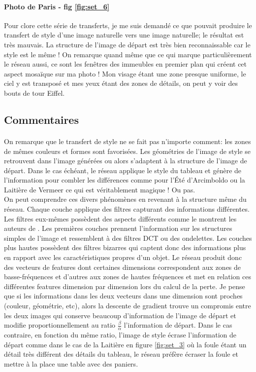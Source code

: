 \documentclass{article}
\begin{document}
\paragraph*{Photo de Paris - fig \ref{fig:set_6}} Pour clore cette série de transferts, je me suis demandé ce que pouvait produire le transfert de style d'une image naturelle vers une image naturelle; le résultat est très mauvais. La structure de l'image de départ est très bien reconnaissable car le style est le même ! On remarque quand même que ce qui marque particulièrement le réseau aussi, ce sont les fenêtres des immeubles en premier plan qui créent cet aspect mosaïque sur ma photo ! Mon visage étant une zone presque uniforme, le ciel y est transposé et mes yeux étant des zones de détails, on peut y voir des bouts de tour Eiffel.

\subsection*{Commentaires}
\paragraph*{} On remarque que le transfert de style ne se fait pas n'importe comment: les zones de mêmes couleurs et formes sont favorisées. Les géométries de l'image de style se retrouvent dans l'image générées ou alors s'adaptent à la structure de l'image de départ. Dans le cas échéant, le réseau applique le style du tableau et génère de l'information pour combler les différences comme pour l’Été d'Arcimboldo ou la Laitière de Vermeer ce qui est véritablement magique ! Ou pas.\\
On peut comprendre ces divers phénomènes en revenant à la structure même du réseau. Chaque couche applique des filtres capturant des informations différentes. Les filtres eux-mêmes possèdent des aspects différents comme le montrent les auteurs de \cite{DBLP:journals/corr/ZeilerF13}. Les premières couches prennent l'information sur les structures simples de l'image et ressemblent à des filtres DCT ou des ondelettes. Les couches plus hautes possèdent des filtres bizarres qui captent donc des informations plus en rapport avec les caractéristiques propres d'un objet. Le réseau produit donc des vecteurs de features dont certaines dimensions correspondent aux zones de basse-fréquences et d'autres aux zones de hautes fréquences et met en relation ces différentes features dimension par dimension lors du calcul de la perte. Je pense que si les informations dans les deux vecteurs dans une dimension sont proches (couleur, géométrie, etc), alors la descente de gradient trouve un compromis entre les deux images qui conserve beaucoup d'information de l'image de départ et modifie proportionnellement au ratio $\frac{\beta}{\alpha}$ l'information de départ. Dans le cas contraire, en fonction du même ratio, l'image de style écrase l'information de départ comme dans le cas de la Laitière en figure \ref{fig:set_3} où la foule étant un détail très différent des détails du tableau, le réseau préfère écraser la foule et mettre à la place une table avec des paniers.
 
\end{document}

